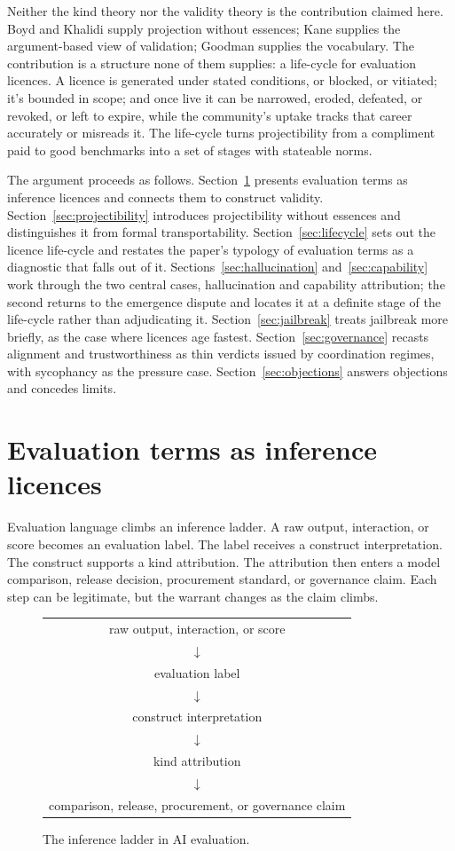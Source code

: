 \documentclass[12pt]{article}
\begin{document}
Neither the kind theory nor the validity theory is the contribution claimed
here. Boyd and Khalidi supply projection without essences; Kane supplies the
argument-based view of validation; Goodman supplies the vocabulary. The
contribution is a structure none of them supplies: a life-cycle for evaluation
licences. A licence is generated under stated conditions, or blocked, or
vitiated; it's bounded in scope; and once live it can be narrowed, eroded,
defeated, or revoked, or left to expire, while the community's uptake tracks
that career accurately or misreads it. The life-cycle turns projectibility from a
compliment paid to good benchmarks into a set of stages with stateable norms.

The argument proceeds as follows.
Section~\ref{sec:licences} presents evaluation terms as inference licences and
connects them to construct validity.
Section~\ref{sec:projectibility} introduces projectibility without essences and
distinguishes it from formal transportability.
Section~\ref{sec:lifecycle} sets out the licence life-cycle and restates the
paper's typology of evaluation terms as a diagnostic that falls out of it.
Sections~\ref{sec:hallucination} and~\ref{sec:capability} work through the two
central cases, hallucination and capability attribution; the second returns to
the emergence dispute and locates it at a definite stage of the life-cycle
rather than adjudicating it.
Section~\ref{sec:jailbreak} treats jailbreak more briefly, as the case where
licences age fastest. Section~\ref{sec:governance} recasts alignment and
trustworthiness as thin verdicts issued by coordination regimes, with
sycophancy as the pressure case. Section~\ref{sec:objections} answers
objections and concedes limits.

\section{Evaluation terms as inference licences}\label{sec:licences}

Evaluation language climbs an inference ladder. A raw output, interaction, or
score becomes an evaluation label. The label receives a construct
interpretation. The construct supports a kind attribution. The attribution then
enters a model comparison, release decision, procurement standard, or governance
claim. Each step can be legitimate, but the warrant changes as the claim climbs.

\begin{figure}[H]
\centering
\small
\begin{tabular}{@{}c@{}}
raw output, interaction, or score \\
\(\downarrow\) \\
evaluation label \\
\(\downarrow\) \\
construct interpretation \\
\(\downarrow\) \\
kind attribution \\
\(\downarrow\) \\
comparison, release, procurement, or governance claim
\end{tabular}
\caption{The inference ladder in AI evaluation.}
\label{fig:inference-ladder}
\end{figure}
\end{document}

